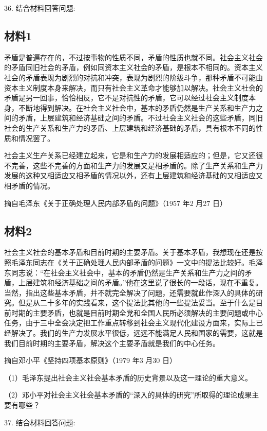 \documentclass[UTF8,11pt]{ctexart}
\begin{document}
36. 结合材料回答问题:


\subsection*{材料1}

矛盾是普遍存在的，不过按事物的性质不同，矛盾的性质也就不同。社会主义社会的矛盾同旧社会的矛盾，例如同资本主义社会的矛盾，是根本不相同的。资本主义社会的矛盾表现为剧烈的对抗和冲突，表现为剧烈的阶级斗争，那种矛盾不可能由资本主义制度本身来解决，而只有社会主义革命才能够加以解决。社会主义社会的矛盾是另一回事，恰恰相反，它不是对抗性的矛盾，它可以经过社会主义制度本身，不断地得到解决。在社会主义社会中，基本的矛盾仍然是生产关系和生产力之间的矛盾，上层建筑和经济基础之间的矛盾。不过社会主义社会的这些矛盾，同旧社会的生产关系和生产力的矛盾、上层建筑和经济基础的矛盾，具有根本不同的性质和情况罢了。

社会主义生产关系已经建立起来，它是和生产力的发展相适应的；但是，它又还很不完善，这些不完善的方面和生产力的发展又是相矛盾的。除了生产关系和生产力发展的这种又相适应又相矛盾的情况以外，还有上层建筑和经济基础的又相适应又相矛盾的情况。

摘自毛泽东《关于正确处理人民内部矛盾的问题》（1957 年2 月27 日）

\subsection*{材料2}

社会主义社会的基本矛盾和目前时期的主要矛盾。关于基本矛盾，我想现在还是按照毛泽东同志在《关于正确处理人民内部矛盾的问题》一文中的提法比较好。毛泽东同志说：“在社会主义社会中，基本的矛盾仍然是生产关系和生产力之间的矛盾，上层建筑和经济基础之间的矛盾。”他在这里说了很长的一段话，现在不重复。当然，指出这些基本矛盾，并不就完全解决了问题，还需要就此作深入的具体的研究。但是从二十多年的实践看来，这个提法比其他的一些提法妥当。至于什么是目前时期的主要矛盾，也就是目前时期全党和全国人民所必须解决的主要问题或中心任务，由于三中全会决定把工作重点转移到社会主义现代化建设方面来，实际上已经解决了。我们的生产力发展水平很低，远远不能满足人民和国家的需要，这就是我们目前时期的主要矛盾，解决这个主要矛盾就是我们的中心任务。

摘自邓小平《坚持四项基本原则》（1979 年3 月30 日）

（1）毛泽东提出社会主义社会基本矛盾的历史背景以及这一理论的重大意义。


（2）邓小平对社会主义社会基本矛盾的“深入的具体的研究”所取得的理论成果主要有哪些？


37. 结合材料回答问题:
\end{document}
